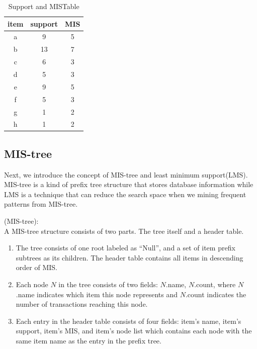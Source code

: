 \documentclass[conference]{IEEEtran}
\begin{document}
\begin{table}[tb]
    \caption{Support and MISTable}
    \centering
    \begin{tabular}{|c|c|c|}
    \hline
    item & support & MIS \\ \hline
    a    & 9      & 5   \\ \hline
    b    & 13      & 7  \\ \hline
    c    & 6      & 3   \\ \hline
    d    & 5       & 3   \\ \hline
    e    & 9       & 5   \\ \hline
    f    & 5       & 3   \\ \hline
    g    & 1       & 2   \\ \hline
    h    & 1       & 2   \\ \hline
    \end{tabular}
    \label{MIS}
\end{table}


\subsection{MIS-tree}
Next, we introduce the concept of MIS-tree and least minimum support(LMS). 
MIS-tree is a kind of prefix tree structure that stores database information while LMS is a technique that can reduce the search space when we mining frequent patterns from MIS-tree.
\begin{definition}{(MIS-tree):}\\
A MIS-tree structure consists of two parts. The tree itself and a header table.
\end{definition}
\begin{enumerate}
    \item The tree consists of one root labeled as ``Null'', and a set of item prefix subtrees as its children. 
    The header table contains all items in descending order of MIS.
    \item Each node $N$ in the tree consists of two fields: $N$.name, $N$.count, where $N$.name indicates which item this node represents and $N$.count indicates the number of transactions reaching this node.
    \item Each entry in the header table consists of four fields: item's name, item's support, item's MIS, and 
    item's node list which contains each node with the same item name as the entry in the prefix tree.
\end{enumerate}
\end{document}
